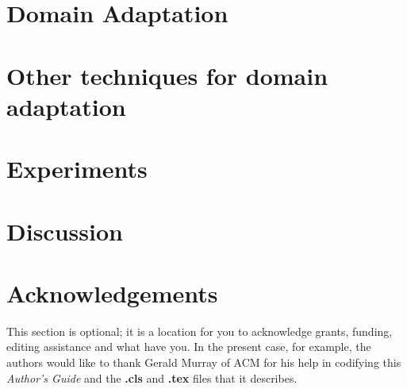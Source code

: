 \documentclass{sigkddExp}
\begin{document}
\section{Domain Adaptation}

\section{Other techniques for domain adaptation}

\section{Experiments}

\section{Discussion}

\section{Acknowledgements}
This section is optional; it is a location for you
to acknowledge grants, funding, editing assistance and
what have you.  In the present case, for example, the
authors would like to thank Gerald Murray of ACM for
his help in codifying this \textit{Author's Guide}
and the \textbf{.cls} and \textbf{.tex} files that it describes.

%

%
%

\end{document}
